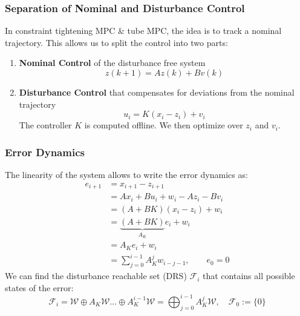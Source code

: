 \subsubsection{Separation of Nominal and Disturbance Control}
In constraint tightening MPC \& tube MPC, the idea is to track a nominal trajectory. This allows us to split the control into two parts:
\begin{enumerate}
    \item \textbf{Nominal Control} of the disturbance free system
          \begin{equation*}
              z(k+1) = Az(k) + Bv(k)
          \end{equation*}
    \item \textbf{Disturbance Control} that compensates for deviations from the nominal trajectory
          \begin{equation*}
              u_i = K(x_i - z_i) + v_i
          \end{equation*}
          The controller $K$ is computed offline. We then optimize over $z_i$ and $v_i$.
\end{enumerate}

\subsubsection{Error Dynamics}
The linearity of the system allows to write the error dynamics as:
\noindent\begin{align*}
    e_{i+1} & = x_{i+1} - z_{i+1}                              \\
            & = Ax_i + Bu_i + w_i - Az_i - Bv_i                \\
            & = (A+BK)(x_i - z_i) + w_i                        \\
            & = \underbrace{(A+BK)}_{A_K}e_i + w_i             \\
            & = A_K e_i + w_i                                  \\
            & = \sum_{j=0}^{i-1} A_K^j w_{i-j-1}, \qquad e_0=0
\end{align*}
We can find the disturbance reachable set (DRS) $\mathcal{F}_i$ that contains all possible states of the error:
\begin{equation*}
    \mathcal{F}_{i}=\mathcal{W}\oplus A_{K}\mathcal{W}...\oplus A_{K}^{i-1}\mathcal{W}=\bigoplus_{j=0}^{i-1}A_{K}^{j}\mathcal{W},\quad\mathcal{F}_{0}:=\{0\}
\end{equation*}

\newpar{}

